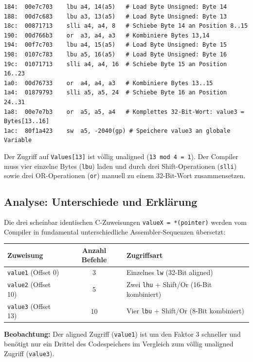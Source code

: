 \begin{verbatim}
184:  00e7c703    lbu a4, 14(a5)   # Load Byte Unsigned: Byte 14
188:  00d7c683    lbu a3, 13(a5)   # Load Byte Unsigned: Byte 13
18c:  00871713    slli a4, a4, 8   # Schiebe Byte 14 an Position 8..15
190:  00d766b3    or  a3, a4, a3   # Kombiniere Bytes 13,14
194:  00f7c703    lbu a4, 15(a5)   # Load Byte Unsigned: Byte 15
198:  0107c783    lbu a5, 16(a5)   # Load Byte Unsigned: Byte 16
19c:  01071713    slli a4, a4, 16  # Schiebe Byte 15 an Position 16..23
1a0:  00d76733    or  a4, a4, a3   # Kombiniere Bytes 13..15
1a4:  01879793    slli a5, a5, 24  # Schiebe Byte 16 an Position 24..31
1a8:  00e7e7b3    or  a5, a5, a4   # Komplettes 32-Bit-Wort: value3 = Bytes[13..16]
1ac:  80f1a423    sw  a5, -2040(gp) # Speichere value3 an globale Variable
\end{verbatim}

Der Zugriff auf \texttt{Values[13]} ist völlig unaligned (\texttt{13 mod 4 = 1}). Der Compiler muss vier einzelne Bytes (\texttt{lbu}) laden und durch drei Shift-Operationen (\texttt{slli}) sowie drei OR-Operationen (\texttt{or}) manuell zu einem 32-Bit-Wort zusammensetzen.

\newpage

\subsection{Analyse: Unterschiede und Erklärung}

Die drei scheinbar identischen C-Zuweisungen \texttt{valueX = *(pointer)} werden vom Compiler in fundamental unterschiedliche Assembler-Sequenzen übersetzt:

\begin{center}
\begin{tabular}{|l|c|l|}
\hline
\textbf{Zuweisung} & \textbf{Anzahl Befehle} & \textbf{Zugriffsart} \\
\hline
\texttt{value1} (Offset 0)  & 3  & Einzelnes \texttt{lw} (32-Bit aligned) \\
\texttt{value2} (Offset 10) & 5  & Zwei \texttt{lhu} + Shift/Or (16-Bit kombiniert) \\
\texttt{value3} (Offset 13) & 10 & Vier \texttt{lbu} + Shift/Or (8-Bit kombiniert) \\
\hline
\end{tabular}
\end{center}

\textbf{Beobachtung:} Der aligned Zugriff (\texttt{value1}) ist um den Faktor 3 schneller und benötigt nur ein Drittel des Codespeichers im Vergleich zum völlig unaligned Zugriff (\texttt{value3}).

